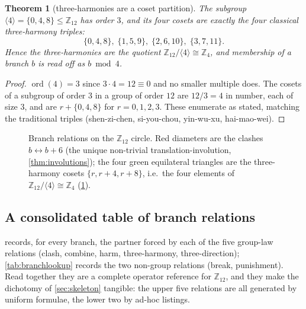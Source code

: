 \documentclass[11pt,a4paper]{article}
\newtheorem{theorem}{Theorem}[section]
\theoremstyle{definition}
\theoremstyle{remark}
\newcommand{\Z}{\mathbb{Z}}
\newcommand{\ord}{\operatorname{ord}}
\begin{document}
\begin{theorem}[three-harmonies are a coset partition]\label{thm:threeharmony}
The subgroup $\langle4\rangle=\{0,4,8\}\le\Z_{12}$ has order $3$, and its four cosets are exactly the four classical \emph{three-harmony} triples:
\[
\{0,4,8\},\;\{1,5,9\},\;\{2,6,10\},\;\{3,7,11\}.
\]
Hence the three-harmonies are the quotient $\Z_{12}/\langle4\rangle\cong\Z_4$, and membership of a branch $b$ is read off as $b\bmod 4$.
\end{theorem}
\begin{proof}
$\ord(4)=3$ since $3\cdot4=12\equiv0$ and no smaller multiple does. The cosets of a subgroup of order $3$ in a group of order $12$ are $12/3=4$ in number, each of size $3$, and are $r+\{0,4,8\}$ for $r=0,1,2,3$. These enumerate as stated, matching the traditional triples (shen-zi-chen, si-you-chou, yin-wu-xu, hai-mao-wei).
\end{proof}

\begin{figure}[h]\centering
{}
\caption{Branch relations on the $\Z_{12}$ circle. Red diameters are the clashes $b\leftrightarrow b{+}6$ (the unique non-trivial translation-involution, \cref{thm:involutions}); the four green equilateral triangles are the three-harmony cosets $\{r,r{+}4,r{+}8\}$, i.e.\ the four elements of $\Z_{12}/\langle4\rangle\cong\Z_4$ (\cref{thm:threeharmony}).}\label{fig:z12}
\end{figure}

\subsection{A consolidated table of branch relations}\label{sec:branchtable}
 records, for every branch, the partner forced by each of the five group-law relations (clash, combine, harm, three-harmony, three-direction); \cref{tab:branchlookup} records the two non-group relations (break, punishment). Read together they are a complete operator reference for $\Z_{12}$, and they make the dichotomy of \cref{sec:skeleton} tangible: the upper five relations are all generated by uniform formulae, the lower two by ad-hoc listings.
\end{document}
